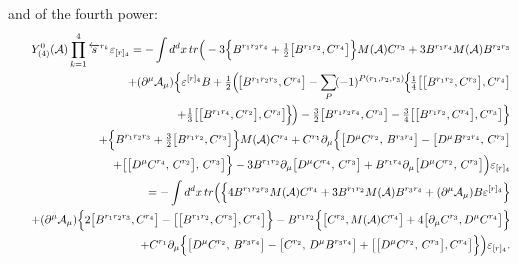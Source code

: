 \documentclass[10pt]{article}
\begin{document}
and of the fourth power:
\begin{eqnarray}    && Y^0_{(4)}(\mathcal{A}) \prod_{k=1}^{4} \overleftarrow{s}{}^{r_k}\varepsilon_{[r]_4} = -\int
d^{d}x  \,tr  \Big( -3\Big\{ B^{r_1r_2r_4} + \textstyle\frac{1}{2}
\big[B^{r_1r_2}, C^{r_4}\big]\Big\}M(\mathcal{A})C^{r_3}
  + 3 B^{r_1r_4}M(\mathcal{A})  B^{r_2r_3} \nonumber \\
&& \quad
 + (\partial^\mu\mathcal{ A}_{\mu }) \Big\{ \varepsilon^{[r]_4}{B}  +\textstyle\frac{1}{2}\Big(\hspace{-0.1em}\big[B^{r_1r_2r_3},C^{r_4}\big]
  - \displaystyle\sum_{P}\hspace{-0.15em}(-1)^{P(r_1,r_2,r_3)}\hspace{-0.1em}\Big\{\hspace{-0.1em}\textstyle\frac{1}{4}\big[\big[B^{r_1r_2},C^{r_3}\big],C^{r_4}\big] \nonumber \\
&& \quad +\textstyle\frac{1}{3} \big[\big[B^{r_1r_4},C^{r_2}\big],C^{r_3}\big] \hspace{-0.1em} \Big\} \hspace{-0.1em}\Big) - \textstyle\frac{3}{2}
\big[B^{r_1r_2r_4}, C^{r_3}\big] -  \textstyle\frac{3}{4}
\big[\big[B^{r_1r_2}, C^{r_4}\big], C^{r_3}\big]\Big\} \nonumber \\
&& \quad  +\Big\{ B^{r_1r_2r_3} + \textstyle\frac{3}{2}
\big[B^{r_1r_2}, C^{r_3}\big]\Big\} M(\mathcal{A})  C^{r_4}     +
 C^{r_1}\partial_\mu \Big\{ \big[D^\mu C^{r_2},\,    B^{r_3r_4}\big] -\big[D^\mu B^{r_2r_4},\,   C^{r_3} \big]\nonumber \\
&& \quad +\big[\big[D^\mu C^{r_4},\,    C^{r_2}\big],\,    C^{r_3}\big]\Big\}- 3 B^{r_1r_2}\partial_\mu \big[D^\mu C^{r_4},\,    C^{r_3}\big]  + B^{r_1r_4}\partial_\mu \big[D^\mu C^{r_2},\,    C^{r_3}\big]\Big)\varepsilon_{[r]_4}\label{ghgf4} \\
&& \   = -\int
d^{d}x  \,tr    \Big(\Big\{4 B^{r_1r_2r_3}M(\mathcal{A}) C^{r_4}  + 3 B^{r_1r_2}M(\mathcal{A})  B^{r_3r_4}+  (\partial^\mu\mathcal{ A}_{\mu })  {B}\varepsilon^{[r]_4}\Big\}  \nonumber \\
&& \quad  + (\partial^\mu\mathcal{ A}_{\mu })  \Big\{2\big[B^{r_1r_2r_3}, C^{r_4}\big]  - \big[\big[B^{r_1r_2}, C^{r_3}\big], C^{r_4}\big]\Big\} -  B^{r_1r_2}\Big\{\big[ C^{r_3},  M(\mathcal{A})C^{r_4}\big]+4\big[ \partial_\mu C^{r_3},  D^\mu C^{r_4}\big]\Big\}\nonumber \\
&& \quad   +
 C^{r_1}\partial_\mu \Big\{ \big[D^\mu C^{r_2},\,    B^{r_3r_4}\big] -\big[C^{r_2},\, D^\mu B^{r_3r_4}   \big] + \big[\big[D^\mu C^{r_2},\, C^{r_3}\big],  C^{r_4}\big]\Big\}\Big)\varepsilon_{[r]_4}.
   \label{AAmu1234}
\end{eqnarray}
\end{document}
